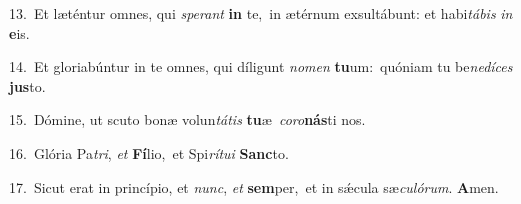 {\numbfont\textcolor{\numbcolor}{13.}}~Et læténtur omnes, qui \textit{spe}\-\textit{rant} \textbf{in} te,~\star in ætérnum exsultábunt: et habi\-\textit{tá}\-\textit{bis} \textit{in} \textbf{e}\-is.\par
{\numbfont\textcolor{\numbcolor}{14.}}~Et gloriabúntur in te omnes, qui díligunt \textit{no}\-\textit{men} \textbf{tu}\-um:~\star quóniam tu be\-\textit{ne}\-\textit{dí}\textit{ces} \textbf{jus}\-to.\par
{\numbfont\textcolor{\numbcolor}{15.}}~Dómine, ut scuto bonæ volun\-\textit{tá}\-\textit{tis} \textbf{tu}\-æ~\star \textit{co}\-\textit{ro}\textbf{nás}ti nos.\par
{\numbfont\textcolor{\numbcolor}{16.}}~Glória Pa\-\textit{tri}\-, \textit{et} \textbf{Fí}\-lio,~\star et Spi\-\textit{rí}\-\textit{tu}\textit{i} \textbf{Sanc}\-to.\par
{\numbfont\textcolor{\numbcolor}{17.}}~Sicut erat in princípio, et \textit{nunc}\-, \textit{et} \textbf{sem}\-per,~\star et in sǽcula sæ\-\textit{cu}\-\textit{ló}\textit{rum}. \textbf{A}\-men.\par
